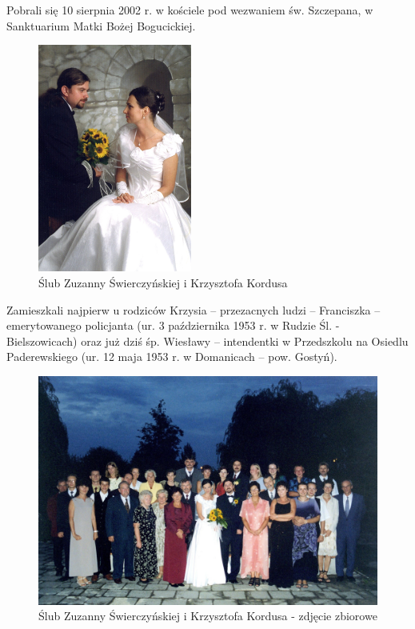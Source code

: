 Pobrali się 10 sierpnia 2002 r. w kościele pod wezwaniem św. Szczepana, w Sanktuarium Matki Bożej Bogucickiej.

\begin{figure}[!h]
\begin{center}
\includegraphics[width=0.45\textwidth]{photo/zuzia_krzysiek_kordus_slub.jpg}
\caption{Ślub Zuzanny Świerczyńskiej i Krzysztofa Kordusa}
\end{center}
\end{figure}

Zamieszkali najpierw u rodziców Krzysia – przezacnych ludzi – Franciszka – emerytowanego policjanta (ur. 3 października 1953 r. w Rudzie Śl. - Bielszowicach) oraz już dziś śp. Wiesławy – intendentki w Przedszkolu na Osiedlu Paderewskiego (ur. 12 maja 1953 r. w Domanicach – pow. Gostyń).
\begin{figure}[!h]
\begin{center}
\includegraphics[width=\textwidth]{photo/zuzia_krzysiek_kordus_slub_2.jpg}
\caption{Ślub Zuzanny Świerczyńskiej i Krzysztofa Kordusa - zdjęcie zbiorowe}
\end{center}
\end{figure}

